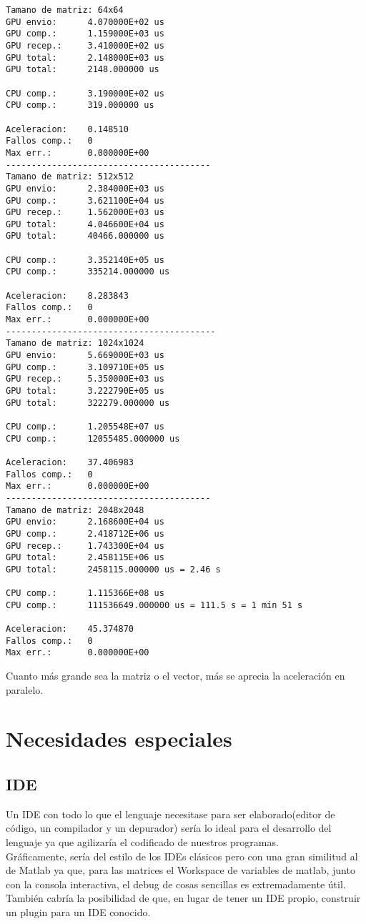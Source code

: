 \documentclass[12pt,a4paper]{article}
\begin{document}
\begin{lstlisting}
Tamano de matriz: 64x64
GPU envio:      4.070000E+02 us
GPU comp.:      1.159000E+03 us
GPU recep.:     3.410000E+02 us
GPU total:      2.148000E+03 us
GPU total:      2148.000000 us

CPU comp.:      3.190000E+02 us
CPU comp.:      319.000000 us

Aceleracion:    0.148510
Fallos comp.:   0
Max err.:       0.000000E+00
----------------------------------------
Tamano de matriz: 512x512
GPU envio:      2.384000E+03 us
GPU comp.:      3.621100E+04 us
GPU recep.:     1.562000E+03 us
GPU total:      4.046600E+04 us
GPU total:      40466.000000 us

CPU comp.:      3.352140E+05 us
CPU comp.:      335214.000000 us

Aceleracion:    8.283843
Fallos comp.:   0
Max err.:       0.000000E+00
-----------------------------------------
Tamano de matriz: 1024x1024
GPU envio:      5.669000E+03 us
GPU comp.:      3.109710E+05 us
GPU recep.:     5.350000E+03 us
GPU total:      3.222790E+05 us
GPU total:      322279.000000 us

CPU comp.:      1.205548E+07 us
CPU comp.:      12055485.000000 us

Aceleracion:    37.406983
Fallos comp.:   0
Max err.:       0.000000E+00
----------------------------------------
Tamano de matriz: 2048x2048
GPU envio:      2.168600E+04 us
GPU comp.:      2.418712E+06 us
GPU recep.:     1.743300E+04 us
GPU total:      2.458115E+06 us
GPU total:      2458115.000000 us = 2.46 s

CPU comp.:      1.115366E+08 us
CPU comp.:      111536649.000000 us = 111.5 s = 1 min 51 s

Aceleracion:    45.374870
Fallos comp.:   0
Max err.:       0.000000E+00
\end{lstlisting}

Cuanto más grande sea la matriz o el vector, más se aprecia la aceleración en
paralelo.
\section{Necesidades especiales}
\subsection{IDE}
Un IDE con todo lo que el lenguaje necesitase para ser elaborado(editor de código, un compilador y un depurador) sería lo ideal para el desarrollo del lenguaje ya que agilizaría el codificado de nuestros programas.\\
Gráficamente, sería del estilo de los IDEs clásicos pero con una gran similitud al de Matlab ya que, para las matrices el Workspace de variables de matlab, junto con la consola interactiva, el debug de cosas sencillas es extremadamente útil.\\
También cabría la posibilidad de que, en lugar de tener un IDE propio, construir un plugin para un IDE conocido.
\end{document}
